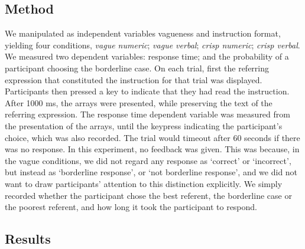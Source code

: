 \documentclass[%
man,		%
floatsintext,%
apacite%
]{apa6}
\begin{document}
\subsection{Method} %
We manipulated as independent variables vagueness and instruction format, yielding four conditions, \emph{vague numeric}; \emph{vague verbal}; \emph{crisp numeric}; \emph{crisp verbal}.
We measured two dependent variables: response time; and the probability of a participant choosing the borderline case.
On each trial, first the referring expression that constituted the instruction for that trial was displayed. 
Participants then pressed a key to indicate that they had read the instruction. 
After 1000 ms, the arrays were presented, while preserving the text of the referring expression. 
The response time dependent variable was measured from the presentation of the arrays, until the keypress indicating the participant's choice, which was also recorded. 
The trial would timeout after 60 seconds if there was no response.
In this experiment, no feedback was given. 
This was because, in the vague conditions, we did not regard any response as `correct' or `incorrect', but instead as `borderline response', or `not borderline response', and we did not want to draw participants' attention to this distinction explicitly. 
We simply recorded whether the participant chose the best referent, the borderline case or the poorest referent, and how long it took the participant to respond.

\subsection{Results} %
\end{document}
